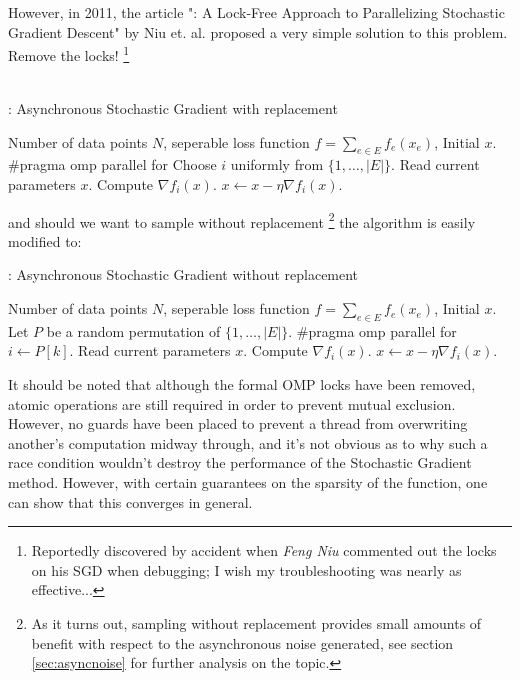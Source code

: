 However, in 2011, the article "\hogwild: A Lock-Free Approach to Parallelizing
Stochastic Gradient Descent" by Niu et. al. \cite{2011niu} proposed a very
simple solution to this problem.  Remove the locks!%
\footnote{
  Reportedly discovered by accident when {\it Feng Niu} commented out the locks
  on his SGD when debugging; I wish my troubleshooting was nearly as
  effective...
}\\\\
\begin{breakablealgorithm}
  \caption{\hogwild: Asynchronous Stochastic Gradient with replacement}
  \label{alg:hogwildwreplacement}
  \begin{algorithmic}[1]
    \Require Number of data points $N$, seperable loss function $f
    = \sum_{e \in E} f_e(x_e)$, Initial $x$.
      \State \#pragma omp parallel for
        \State Choose $i$ uniformly from $\{1, \dots, |E|\}$.
        \State Read current parameters $x$.
        \State Compute $\nabla f_i(x)$.
        \State $x \gets x - \eta \nabla f_i(x)$. 
      \EndFor
    \EndFor
  \end{algorithmic}
\end{breakablealgorithm}
and should we want to sample without replacement%
\footnote{As it turns out, sampling without replacement provides small amounts
  of benefit with respect to the asynchronous noise generated, see section
  \ref{sec:asyncnoise} for further analysis on the topic.
} the algorithm is easily modified to:
\begin{breakablealgorithm}
  \caption{\hogwild: Asynchronous Stochastic Gradient without replacement}
  \label{alg:hogwildworeplacement}
  \begin{algorithmic}[1]
    \Require Number of data points $N$, seperable loss function $f
    = \sum_{e \in E} f_e(x_e)$, Initial $x$.
      \State Let $P$ be a random permutation of $\{1, \dots, |E|\}$.
      \State \#pragma omp parallel for
        \State $i \gets P[k]$.
        \State Read current parameters $x$.
        \State Compute $\nabla f_i(x)$.
        \State $x \gets x - \eta \nabla f_i(x)$. 
      \EndFor
    \EndFor
  \end{algorithmic}
\end{breakablealgorithm}

It should be noted that although the formal OMP locks have been removed, atomic
operations are still required in order to prevent mutual exclusion. However, no
guards have been placed to prevent a thread from overwriting another's
computation midway through, and it's not obvious as to why such a race condition
wouldn't destroy the performance of the Stochastic Gradient method. However,
with certain guarantees on the sparsity of the function, one can show that this
converges in general.
